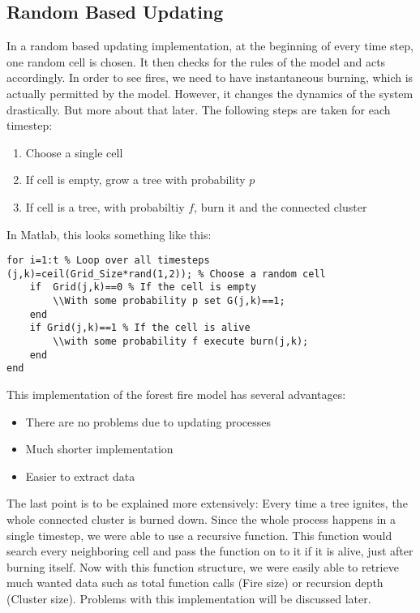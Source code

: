 \documentclass[11pt]{article}
\begin{document}
\subsection{Random Based Updating}
In a random based updating implementation, at the beginning of every time step, one random cell is chosen. It then checks for the rules of the model and acts accordingly. In order to see fires, we need to have instantaneous burning, which is actually permitted by the model. However, it changes the dynamics of the system drastically. But more about that later. The following steps are taken for each timestep:

\begin{enumerate}
\item Choose a single cell
\item If cell is empty, grow a tree with probability $p$
\item If cell is a tree, with probabiltiy $f$, burn it and the connected cluster
\end{enumerate}
In Matlab, this looks something like this:
\begin{verbatim}
for i=1:t % Loop over all timesteps
(j,k)=ceil(Grid_Size*rand(1,2)); % Choose a random cell
	if  Grid(j,k)==0 % If the cell is empty
		\\With some probability p set G(j,k)==1;
	end
	if Grid(j,k)==1 % If the cell is alive
		\\with some probability f execute burn(j,k);
	end
end
\end{verbatim}

This implementation of the forest fire model has several advantages:
\begin{itemize}
\item There are no problems due to updating processes
\item Much shorter implementation
\item Easier to extract data
\end{itemize}
The last point is to be explained more extensively: Every time a tree ignites, the whole connected cluster is burned down. Since the whole process happens in a single timestep, we were able to use a recursive function. This function would search every neighboring cell and pass the function on to it if it is alive, just after burning itself. Now with this function structure, we were easily able to retrieve much wanted data such as total function calls (Fire size) or recursion depth (Cluster size). Problems with this implementation will be discussed later.
\end{document}
